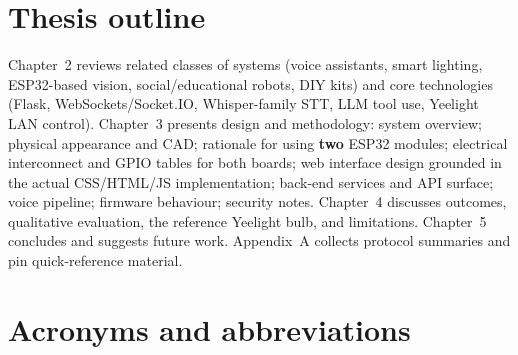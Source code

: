 \documentclass[12pt,a4paper]{report}
\begin{document}
\section{Thesis outline}

Chapter~2 reviews related classes of systems (voice assistants, smart lighting, ESP32-based vision, social/educational robots, DIY kits) and core technologies (Flask, WebSockets/Socket.IO, Whisper-family STT, LLM tool use, Yeelight LAN control). Chapter~3 presents design and methodology: system overview; physical appearance and CAD; rationale for using \textbf{two} ESP32 modules; electrical interconnect and GPIO tables for both boards; web interface design grounded in the actual CSS/HTML/JS implementation; back-end services and API surface; voice pipeline; firmware behaviour; security notes. Chapter~4 discusses outcomes, qualitative evaluation, the reference Yeelight bulb, and limitations. Chapter~5 concludes and suggests future work. Appendix~A collects protocol summaries and pin quick-reference material.

\section{Acronyms and abbreviations}
\end{document}
